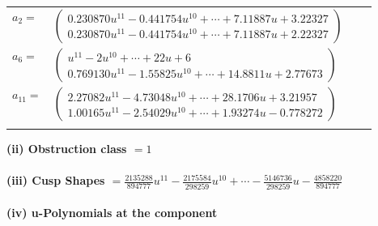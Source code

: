 \documentclass[1p]{elsarticle_modified}
\theoremstyle{definition}
\begin{document}
\begin{tabular}{m{7pt} m{180pt} m{7pt} m{180pt} }
\flushright $a_{2}=$&$\begin{pmatrix}0.230870 u^{11}-0.441754 u^{10}+\cdots+7.11887 u+3.22327\\0.230870 u^{11}-0.441754 u^{10}+\cdots+7.11887 u+2.22327\end{pmatrix}$ \\
\flushright $a_{6}=$&$\begin{pmatrix}u^{11}-2 u^{10}+\cdots+22 u+6\\0.769130 u^{11}-1.55825 u^{10}+\cdots+14.8811 u+2.77673\end{pmatrix}$ \\
\flushright $a_{11}=$&$\begin{pmatrix}2.27082 u^{11}-4.73048 u^{10}+\cdots+28.1706 u+3.21957\\1.00165 u^{11}-2.54029 u^{10}+\cdots+1.93274 u-0.778272\end{pmatrix}$\\&\end{tabular}
\flushleft \textbf{(ii) Obstruction class $= 1$}\\~\\
\flushleft \textbf{(iii) Cusp Shapes $= \frac{2135288}{894777} u^{11}-\frac{2175584}{298259} u^{10}+\cdots-\frac{5146736}{298259} u-\frac{4858220}{894777}$}\\~\\
\newpage\renewcommand{\arraystretch}{1}
\flushleft \textbf{(iv) u-Polynomials at the component}\newline \\
\end{document}

